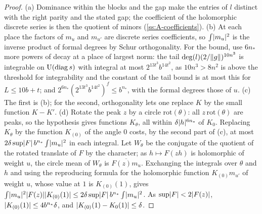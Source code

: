 \begin{proof}
(a) Dominance within the blocks and the gap make the entries of $l$ distinct with the right parity and the stated gap; the coefficient of the holomorphic discrete series is then the quotient of minors (\cref{ss:A-coefficients}). (b) At each
place the factors of $m_u$ and $m_{u'}$ are discrete series coefficients, so $\int\lvert m_u\rvert^2$ is the inverse product of formal degrees by Schur orthogonality. For the bound, use $6n_*$ more powers of decay at a place of largest norm: the tail
$\deg(l)(2/\lVert g\rVert)^{10n^3}$ is integrable on $\operatorname{U}(\mathrm{diag}\,s)$ with integral at most $2^{13t^3}b^{14t^2}$, as $10n^3>8n^2$ is above the threshold for integrability and the constant of the tail bound is at most this for $L\le10b+t$; and
$2^{6n_*}(2^{13t^3}b^{14t^2})^f\le b^{n_*}$, with the formal degrees those of $u$. (c) The first is (b); for the second, orthogonality lets one replace $K$ by the small function $K-K'$. (d) Rotate the peak $z$ by a circle $\mathrm{rot}(\theta)$: all $z\,\mathrm{rot}(\theta)$
are peaks, so the hypothesis gives functions $K_\theta$, all within $\delta\lvert h\rvert^{6n_*}$ of $K_0$. Replacing $K_\theta$ by the function $K_{(0)}$ of the angle $0$ costs, by the second part of (c), at
most $2\delta\sup\lvert F\rvert\,b^{n_*}\int\lvert m_u\rvert^2$ in each integral. Let $W_\theta$ be the conjugate of the quotient of the rotated translate of $F$ by the character; as $h\mapsto F(zh)$ is
holomorphic of weight $u$, the circle mean of $W_\theta$ is $\overline{F(z)m_u}$. Exchanging the integrals over $\theta$ and $h$ and using the reproducing formula for the holomorphic function $K_{(0)}m_{u'}$ of weight $u$, whose value at $1$ is $K_{(0)}(1)$, gives
$\int\lvert m_u\rvert^2\lvert F(z)\rvert\lvert K_{(0)}(1)\rvert\le2\delta\sup\lvert F\rvert\,b^{n_*}\int\lvert m_u\rvert^2$. As $\sup\lvert F\rvert<2\lvert F(z)\rvert$, $\lvert K_{(0)}(1)\rvert\le4b^{n_*}\delta$, and $\lvert K_{(0)}(1)-K_0(1)\rvert\le\delta$.
\end{proof}


